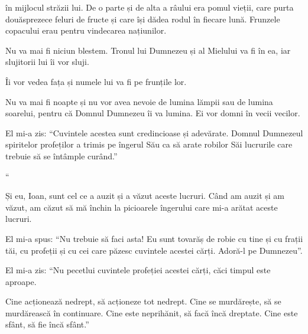{în mijlocul străzii lui. De o parte și de alta a râului era pomul vieții, care purta douăsprezece feluri de fructe și care își dădea rodul în fiecare lună. Frunzele copacului erau pentru vindecarea națiunilor.

Nu va mai fi niciun blestem. Tronul lui Dumnezeu și al Mielului va fi în ea, iar slujitorii lui îi vor sluji.

Îi vor vedea fața și numele lui va fi pe frunțile lor.

Nu va mai fi noapte și nu vor avea nevoie de lumina lămpii sau de lumina soarelui, pentru că Domnul Dumnezeu îi va lumina. Ei vor domni în vecii vecilor.


\par }{\PP {}El mi-a zis: “Cuvintele acestea sunt credincioase și adevărate. Domnul Dumnezeul spiritelor profeților a trimis pe îngerul Său ca să arate robilor Săi lucrurile care trebuie să se întâmple curând.”


\par }{\PP {}“{}


\par }{\PP {}Și eu, Ioan, sunt cel ce a auzit și a văzut aceste lucruri. Când am auzit și am văzut, am căzut să mă închin la picioarele îngerului care mi-a arătat aceste lucruri.

El mi-a spus: “Nu trebuie să faci asta! Eu sunt tovarăș de robie cu tine și cu frații tăi, cu profeții și cu cei care păzesc cuvintele acestei cărți. Adoră-l pe Dumnezeu”.

El mi-a zis: “Nu pecetlui cuvintele profeției acestei cărți, căci timpul este aproape.

Cine acționează nedrept, să acționeze tot nedrept. Cine se murdărește, să se murdărească în continuare. Cine este neprihănit, să facă încă dreptate. Cine este sfânt, să fie încă sfânt.”


\par }{\PP {}



}
